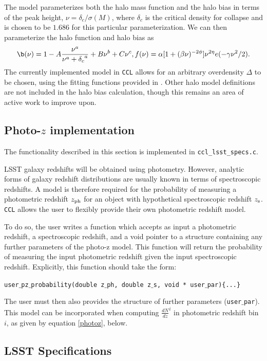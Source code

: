 \documentclass[\docopts]{\docclass}
\begin{document}
The \citet{Tinker2010} model parameterizes both the halo mass function and the halo bias in terms of the peak height, $\nu = \delta_c / \sigma(M)$, where $\delta_c$ is the critical density for collapse and is chosen to be $1.686$ for this particular parameterization. We can then parameterize the halo function and halo bias as
\begin{equation}
  \b(\nu) = 1 - A\frac{\nu^a}{\nu^a + {\delta_c}^a} + B\nu^b+C\nu^c,
  f(\nu) = \alpha[1+(\beta\nu)^{-2\phi}]\nu^{2\eta}e(-\gamma\nu^2/2).
\end{equation}
The currently implemented model in {\tt CCL} allows for an arbitrary overdensity $\Delta$ to be chosen, using the fitting functions provided in \citet{Tinker2010}. Other halo model definitions are not included in the halo bias calculation, though this remains an area of active work to improve upon.

\subsection{Photo-$z$ implementation}
\label{sec:photoz}
The functionality described in this section is implemented in {\tt ccl\_lsst\_specs.c}.

LSST galaxy redshifts will be obtained using photometry. However, analytic forms of galaxy redshift distributions are usually known in terms of spectroscopic redshifts. A model is therefore required for the probability of measuring a photometric redshift $z_{\rm ph}$ for an object with hypothetical spectroscopic redshift $z_{\rm s}$. {\tt CCL} allows the user to flexibly provide their own photometric redshift model.

To do so, the user writes a function which accepts as input a photometric redshift, a spectroscopic redshift, and a void pointer to a structure containing any further parameters of the photo-z model. This function will return the probability of measuring the input photometric redshift given the input spectroscopic redshift. Explicitly, this function should take the form:

{\tt user$\_$pz$\_$probability(double z$\_$ph, double z$\_$s, void * user$\_$par)\{...\}}

The user must then also provides the structure of further parameters ({\tt user$\_$par}). This model can be incorporated when computing $\frac{dN}{dz}^i$ in photometric redshift bin $i$, as given by equation \ref{photoz}, below.

\subsection{LSST Specifications}
\label{sec:specs}
\end{document}
